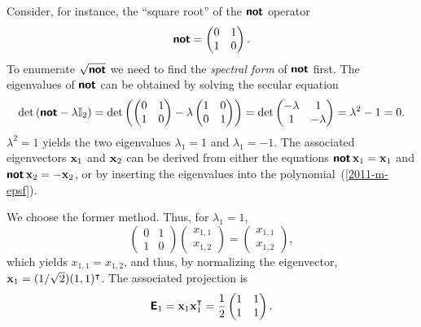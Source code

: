 {Consider, for instance, the ``square root''  of the $\textsf{\textbf{not}}$ operator
\begin{equation}
\textsf{\textbf{not}}
=
\begin{pmatrix}
 0&1\\  1&0
\end{pmatrix}.
\end{equation}
To enumerate $\sqrt{\textsf{\textbf{not}}}$  we need to find the {\em spectral form} of $\textsf{\textbf{not}}$ first.
The eigenvalues of  $\textsf{\textbf{not}}$ can be obtained by solving the
secular equation
\begin{equation}
\text{det}
\left(
\textsf{\textbf{not}} - \lambda {\Bbb I}_2
\right)
=
\text{det}
\left(
\begin{pmatrix}
 0&1\\  1&0
\end{pmatrix}
-
\lambda
\begin{pmatrix}
1&0\\  0&1
\end{pmatrix}
\right)
=
\text{det}
\begin{pmatrix}
 -\lambda&1\\
1&-\lambda
\end{pmatrix}
   =\lambda^2-1=0.
\end{equation}
$\lambda^2=1$ yields the two eigenvalues
$\lambda_1=1$
and
$\lambda_1=-1$.
The associated eigenvectors
${\bf x}_1$
and
${\bf x}_2$
can be derived from either the equations
$\textsf{\textbf{not}}\,{\bf x}_1={\bf x}_1$
and
$\textsf{\textbf{not}}\,{\bf x}_2=-{\bf x}_2$,
or by inserting the eigenvalues into the polynomial~(\ref{2011-m-epsf}).

We choose the former method.
Thus, for $\lambda_1=1$,
\begin{equation}
\begin{pmatrix}
 0&1\\  1&0
\end{pmatrix}
\begin{pmatrix}
x_{1,1}\\x_{1,2}
\end{pmatrix}
=\begin{pmatrix}
x_{1,1}\\x_{1,2}
\end{pmatrix}
,
\end{equation}
which yields  $x_{1,1}=x_{1,2}$, and thus, by normalizing the eigenvector,
${\bf x}_1=(1/\sqrt{2})(1,1)^\intercal $.
The associated projection is
\begin{equation}
\textsf{\textbf{E}}_1={\bf x}_1{\bf x}_1^\intercal =\frac{1}{2}
\begin{pmatrix}
 1&1\\  1&1
\end{pmatrix}
.
\end{equation}


}
